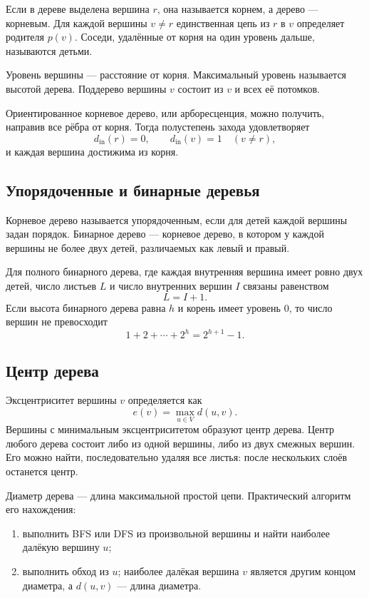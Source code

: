 Если в дереве выделена вершина $r$, она называется корнем, а дерево ---
корневым. Для каждой вершины $v\neq r$ единственная цепь из $r$ в $v$
определяет родителя $p(v)$. Соседи, удалённые от корня на один уровень дальше,
называются детьми.

Уровень вершины --- расстояние от корня. Максимальный уровень называется высотой
дерева. Поддерево вершины $v$ состоит из $v$ и всех её потомков.

Ориентированное корневое дерево, или арборесценция, можно получить, направив все
рёбра от корня. Тогда полустепень захода удовлетворяет
\[
    d_{\mathrm{in}}(r)=0,
    \qquad
    d_{\mathrm{in}}(v)=1\quad(v\neq r),
\]
и каждая вершина достижима из корня.

\subsection{Упорядоченные и бинарные деревья}

Корневое дерево называется упорядоченным, если для детей каждой вершины задан
порядок. Бинарное дерево --- корневое дерево, в котором у каждой вершины не более
двух детей, различаемых как левый и правый.

Для полного бинарного дерева, где каждая внутренняя вершина имеет ровно двух
детей, число листьев $L$ и число внутренних вершин $I$ связаны равенством
\[
    L=I+1.
\]
Если высота бинарного дерева равна $h$ и корень имеет уровень $0$, то число
вершин не превосходит
\[
    1+2+\cdots+2^h=2^{h+1}-1.
\]

\subsection{Центр дерева}

Эксцентриситет вершины $v$ определяется как
\[
    e(v)=\max_{u\in V}d(u,v).
\]
Вершины с минимальным эксцентриситетом образуют центр дерева. Центр любого дерева
состоит либо из одной вершины, либо из двух смежных вершин. Его можно найти,
последовательно удаляя все листья: после нескольких слоёв останется центр.

Диаметр дерева --- длина максимальной простой цепи. Практический алгоритм его
нахождения:
\begin{enumerate}
    \item выполнить BFS или DFS из произвольной вершины и найти наиболее далёкую
          вершину $u$;
    \item выполнить обход из $u$; наиболее далёкая вершина $v$ является другим
          концом диаметра, а $d(u,v)$ --- длина диаметра.
\end{enumerate}


